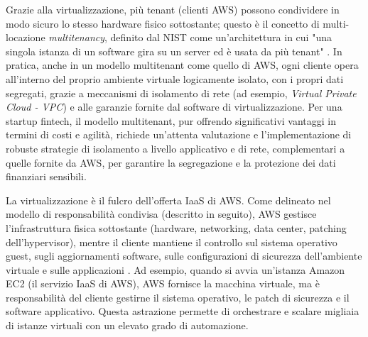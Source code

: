 Grazie alla virtualizzazione, più tenant (clienti AWS) possono condividere in modo sicuro lo stesso hardware fisico sottostante; questo è il concetto di multi-locazione \textit{multitenancy}, definito dal NIST come un'architettura in cui "una singola istanza di un software gira su un server ed è usata da più tenant" \cite{nist800-145}. In pratica, anche in un modello multitenant come quello di AWS, ogni cliente opera all'interno del proprio ambiente virtuale logicamente isolato, con i propri dati segregati, grazie a meccanismi di isolamento di rete (ad esempio, \textit{Virtual Private Cloud - VPC}) e alle garanzie fornite dal software di virtualizzazione. Per una startup fintech, il modello multitenant, pur offrendo significativi vantaggi in termini di costi e agilità, richiede un'attenta valutazione e l'implementazione di robuste strategie di isolamento a livello applicativo e di rete, complementari a quelle fornite da AWS, per garantire la segregazione e la protezione dei dati finanziari sensibili.

La virtualizzazione è il fulcro dell'offerta IaaS di AWS. Come delineato nel modello di responsabilità condivisa (descritto in seguito), AWS gestisce l'infrastruttura fisica sottostante (hardware, networking, data center, patching dell'hypervisor), mentre il cliente mantiene il controllo sul sistema operativo guest, sugli aggiornamenti software, sulle configurazioni di sicurezza dell'ambiente virtuale e sulle applicazioni \cite{aws-well-architected}. Ad esempio, quando si avvia un'istanza Amazon EC2 (il servizio IaaS di AWS), AWS fornisce la macchina virtuale, ma è responsabilità del cliente gestirne il sistema operativo, le patch di sicurezza e il software applicativo. Questa astrazione permette di orchestrare e scalare migliaia di istanze virtuali con un elevato grado di automazione.


